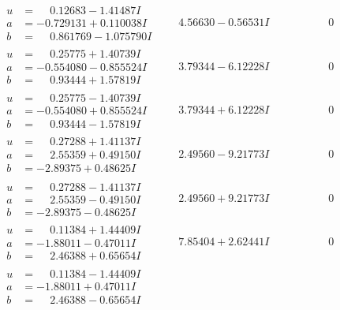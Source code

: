 \documentclass[1p]{elsarticle_modified}
\theoremstyle{definition}
\begin{document}
$$\begin{array}{c|c|c}
\begin{aligned}
u &= \phantom{-}0.12683 - 1.41487 I \\
a &= -0.729131 + 0.110038 I \\
b &= \phantom{-}0.861769 - 1.075790 I\end{aligned}
 & \phantom{-}4.56630 - 0.56531 I & \phantom{-0.000000 } 0 \\ \hline\begin{aligned}
u &= \phantom{-}0.25775 + 1.40739 I \\
a &= -0.554080 - 0.855524 I \\
b &= \phantom{-}0.93444 + 1.57819 I\end{aligned}
 & \phantom{-}3.79344 - 6.12228 I & \phantom{-0.000000 } 0 \\ \hline\begin{aligned}
u &= \phantom{-}0.25775 - 1.40739 I \\
a &= -0.554080 + 0.855524 I \\
b &= \phantom{-}0.93444 - 1.57819 I\end{aligned}
 & \phantom{-}3.79344 + 6.12228 I & \phantom{-0.000000 } 0 \\ \hline\begin{aligned}
u &= \phantom{-}0.27288 + 1.41137 I \\
a &= \phantom{-}2.55359 + 0.49150 I \\
b &= -2.89375 + 0.48625 I\end{aligned}
 & \phantom{-}2.49560 - 9.21773 I & \phantom{-0.000000 } 0 \\ \hline\begin{aligned}
u &= \phantom{-}0.27288 - 1.41137 I \\
a &= \phantom{-}2.55359 - 0.49150 I \\
b &= -2.89375 - 0.48625 I\end{aligned}
 & \phantom{-}2.49560 + 9.21773 I & \phantom{-0.000000 } 0 \\ \hline\begin{aligned}
u &= \phantom{-}0.11384 + 1.44409 I \\
a &= -1.88011 - 0.47011 I \\
b &= \phantom{-}2.46388 + 0.65654 I\end{aligned}
 & \phantom{-}7.85404 + 2.62441 I & \phantom{-0.000000 } 0 \\ \hline\begin{aligned}
u &= \phantom{-}0.11384 - 1.44409 I \\
a &= -1.88011 + 0.47011 I \\
b &= \phantom{-}2.46388 - 0.65654 I\end{aligned}

\end{array}$$
\end{document}
